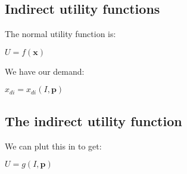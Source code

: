
\subsection{Indirect utility functions}

The normal utility function is:

\(U=f(\mathbf x)\)

We have our demand:

\(x_{di}=x_{di}(I, \mathbf p)\)

\subsection{The indirect utility function}

We can plut this in to get:

\(U=g(I, \mathbf p)\)

